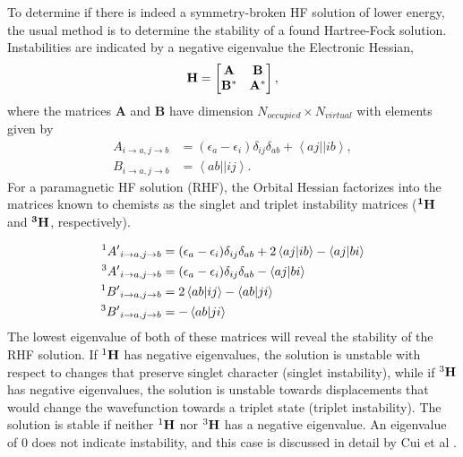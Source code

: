 \documentclass{revtex4}
\begin{document}
    To determine if there is indeed a symmetry-broken HF solution of lower energy, the usual method 
    is to determine the stability of a found Hartree-Fock solution. Instabilities are indicated by a
    negative
    eigenvalue the Electronic Hessian, 
    \begin{equation}
     \bf{H}=
     \begin{bmatrix}
     \bf{A} &\bf{B} \\
     \bf{B}^* & \bf{A}^* \\
     \end{bmatrix},
    \end{equation} 
    where the matrices $\mathbf{A}$ and $\mathbf{B}$ have dimension $N_{occupied} \times 
    N_{virtual}$ with elements given by
    \begin{align}
     A_{i \rightarrow a, j \rightarrow b} &= (\epsilon_a-\epsilon_i)\delta_{ij}\delta_{ab} 
     + \left< aj||ib \right>, \\
     B_{i \rightarrow a, j \rightarrow b} &= \left< ab||ij \right>. 
    \end{align}    
    For a paramagnetic HF solution (RHF), the Orbital Hessian
    factorizes into the matrices known to 
    chemists as the singlet and triplet instability matrices ($\bf{{}^1H}$ and $\bf{{}^3H}$, 
    respectively)\cite{Dunning1967,Seeger1977}.
    
     \begin{subequations}
     	\begin{align}
     	{}^{1}{A'}_{i\rightarrow a, j\rightarrow b} &= (\epsilon_a-\epsilon_i)\delta_{ij}\delta_{ab} 
     	+ 2\braket{aj|ib}-\braket{aj|bi}\\
     	{}^{3}{A'}_{i\rightarrow a, j\rightarrow b} &= (\epsilon_a-\epsilon_i)\delta_{ij}\delta_{ab} 
     	- \braket{aj|bi}\\
     	{}^{1}{B'}_{i\rightarrow a, j\rightarrow b} &= 2\braket{ab|ij}-\braket{ab|ji}\\
     	{}^{3}{B'}_{i\rightarrow a, j\rightarrow b} &= -\braket{ab|ji}
     	\end{align}
     \end{subequations}
      The lowest eigenvalue of both of 
     these matrices will reveal the stability of the RHF solution. If  ${}^1\bf{H}$ has negative 
     eigenvalues, the
     solution is unstable with respect to changes that preserve singlet character (singlet 
     instability), while if ${}^3\bf{H}$ has negative eigenvalues, the solution is unstable towards 
     displacements that would change the wavefunction towards a triplet state (triplet 
     instability). The solution is stable if neither ${}^1\bf{H}$ nor ${}^3\bf{H}$ has a negative 
     eigenvalue. An 
     eigenvalue of 0 does not indicate instability, and this case is discussed 
     in detail by Cui et al \cite{Cui2013}.
    
\end{document}
